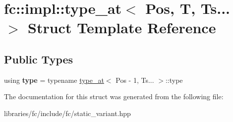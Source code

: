 \hypertarget{structfc_1_1impl_1_1type__at_3_01_pos_00_01_t_00_01_ts_8_8_8_01_4}{}\section{fc\+:\+:impl\+:\+:type\+\_\+at$<$ Pos, T, Ts... $>$ Struct Template Reference}
\label{structfc_1_1impl_1_1type__at_3_01_pos_00_01_t_00_01_ts_8_8_8_01_4}
\subsection*{Public Types}
\begin{DoxyCompactItemize}
\item 
\mbox{\label{structfc_1_1impl_1_1type__at_3_01_pos_00_01_t_00_01_ts_8_8_8_01_4_a697db37728c717ebd196da5144078021}} 
using {\bfseries type} = typename \mbox{\hyperlink{structfc_1_1impl_1_1type__at}{type\+\_\+at}}$<$ Pos -\/ 1, Ts... $>$\+::type
\end{DoxyCompactItemize}


The documentation for this struct was generated from the following file\+:\begin{DoxyCompactItemize}
\item 
libraries/fc/include/fc/static\+\_\+variant.\+hpp\end{DoxyCompactItemize}
